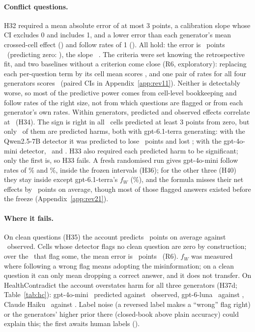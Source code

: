 \paragraph{Conflict questions.}
H32 required a mean absolute error of at most 3 points, a calibration slope whose CI excludes 0 and includes 1, and
a lower error than each generator's mean crossed-cell effect (\frMaeGen) and follow rates of 1 (\frMaeOnes). All
hold: the error is \frMae\ points \frMaeCI\ (predicting zero: \frMaeZero), the slope \frSlope\ \frSlopeCI. The criteria were set knowing the retrospective fit, and two baselines without a criterion come
close (R6, exploratory): replacing each per-question term by its cell mean scores \frMaeMarg, and one pair of rates
for all four generators scores \acctCommonMae\ (paired CIs in Appendix~\ref{app:rev11}). Neither is detectably worse, so most of the predictive power comes from cell-level bookkeeping
and follow rates of the right size, not from which questions are flagged or from each generator's own rates. Within
generators, predicted and observed effects correlate at \frRWithin\ (H34). The sign is right in all \frBigN\ cells
predicted at least 3 points from zero, but only \acctHarmN\ of them are predicted harms, both with gpt-6.1-terra
generating: with the Qwen2.5-7B detector it was predicted to lose \aacctHarmTerraQwenPred\ points and lost
\aacctHarmTerraQwenObs; with the gpt-4o-mini detector, \aacctHarmTerraMiniPred\ and \aacctHarmTerraMiniObs. H33 also
required each predicted harm to be significant; only the first is, so H33 fails. A fresh randomised run gives
gpt-4o-mini follow rates of \frFollowR\% and \frFollowW\%, inside the frozen intervals (H36); for the other three
(H40) they stay inside except gpt-6.1-terra's $f_W$ (\cxFrTerraFolW\%), and the formula misses their net effects by
\cxFrMae\ points on average, though most of those flagged answers existed before the freeze (Appendix~\ref{app:rev21}).

\paragraph{Where it fails.}
On clean questions (H35) the account predicts \frCleanPred\ points on average against \frCleanObs\ observed. Cells
whose detector flags no clean question are zero by construction; over the \acctCleanNFlag\ that flag some, the mean
error is \acctCleanMaeFlag\ points \acctCleanMaeFlagCI\ (R6). $f_W$ was measured where following a wrong flag means
adopting the misinformation; on a clean question it can only mean dropping a correct answer, and it does not
transfer. On HealthContradict the account overstates harm for all three generators (H37d; Table~\ref{tab:hc}):
gpt-4o-mini \hcLlmPredMini\ predicted against \hcLlmMini\ observed, gpt-6-luna \hcLlmPredLuna\ against \hcLlmLuna,
Claude Haiku \hcLlmPredHaiku\ against \hcLlmHaiku. Label noise (a reversed label makes a ``wrong'' flag right) or the
generators' higher prior there (closed-book above plain accuracy) could explain this; the first awaits human labels
().

